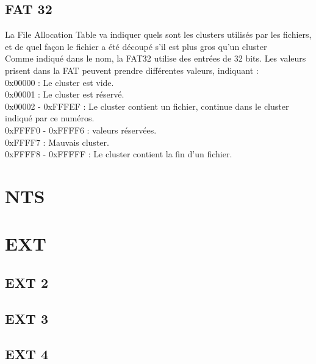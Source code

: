 \documentclass[11pt]{report}
\begin{document}
\section{FAT 32}
La File Allocation Table va indiquer quels sont les clusters utilisés par les fichiers, et de quel façon le fichier a été découpé s'il est plus gros qu'un cluster \\
Comme indiqué dans le nom, la FAT32 utilise des entrées de 32 bits.
Les valeurs prisent dans la FAT peuvent prendre différentes valeurs, indiquant : \\
0x00000 : Le cluster est vide.\\
0x00001 : Le cluster est réservé.\\
0x00002 - 0xFFFEF : Le cluster contient un fichier, continue dans le cluster indiqué par ce numéros.\\
0xFFFF0 - 0xFFFF6 : valeurs réservées.\\
0xFFFF7 : Mauvais cluster.\\
0xFFFF8 - 0xFFFFF : Le cluster contient la fin d'un fichier.\\


\chapter{NTS}


\chapter{EXT}

\section{EXT 2}

\section{EXT 3}

\section{EXT 4}
\end{document}
